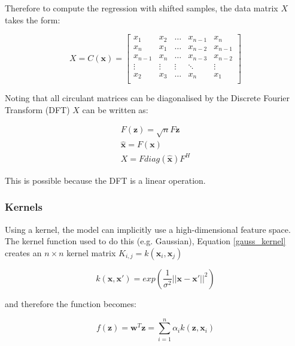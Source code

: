 \documentclass[a4paper,11pt,notitlepage]{article}
\begin{document}
Therefore to compute the regression with shifted samples, the data matrix $X$ takes the form:

\begin{equation}
X = C(\mathbf{x}) = 
\begin{bmatrix}
x_{1} & x_{2} & \dots & x_{n-1} & x_{n} \\
x_{n} & x_{1} & \dots & x_{n-2}  & x_{n-1}  \\
x_{n-1} & x_{n} & \dots & x_{n-3} & x_{n-2}  \\
\vdots & \vdots & \vdots & \ddots & \vdots \\
x_{2}  & x_{3}  & \dots & x_{n} & x_{1} \\
\end{bmatrix}
\end{equation}

Noting that all circulant matrices can be diagonalised by the Discrete Fourier Transform (DFT) $X$ can be written as:


\begin{equation}
\begin{aligned}
\mathit{F}(\mathbf{z}) = \sqrt{n}F\mathbf{z} \\
\hat{\mathbf{x}} = \mathit{F}(\mathbf{x}) \\
X = F diag(\hat{\mathbf{x}}) F^{H}
\end{aligned}
\end{equation}

This is possible because the DFT is a linear operation. 

\subsubsection{Kernels}

Using a kernel, the model can implicitly use a high-dimensional feature space. The kernel function used to do this (e.g. Gaussian), Equation \ref{gauss_kernel} creates an $n \times n$ kernel matrix $K_{i,j} = k(\mathbf{x}_{i},\mathbf{x}_{j})$

\begin{equation}
k(\mathbf{x},\mathbf{x}') = exp (\frac{1}{\sigma^{2}} ||\mathbf{x} - \mathbf{x}'||^{2})
\label{gauss_kernel}
\end{equation}

and therefore the function becomes:

\begin{equation}
f(\mathbf{z}) = \mathbf{w}^{T}\mathbf{z} = \sum_{i=1}^{n} \alpha_{i}k(\mathbf{z},\mathbf{x}_{i})
\end{equation}
\end{document}
